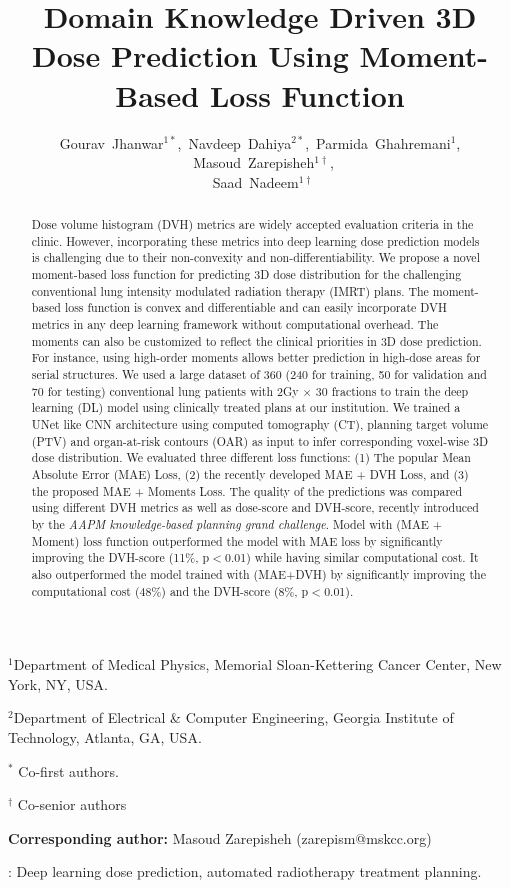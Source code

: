 \documentclass[10pt]{article}
\title{Domain Knowledge Driven 3D Dose Prediction Using Moment-Based Loss Function}
\author{Gourav~Jhanwar$^{1*}$,~Navdeep~Dahiya$^{2*}$,~Parmida~Ghahremani$^{1}$, ~Masoud~Zarepisheh$^{1\dagger}$,\\~Saad~Nadeem$^{1\dagger}$}
\date{}
\begin{document}
\maketitle

{\footnotesize
\noindent
$^1$Department of Medical Physics, Memorial Sloan-Kettering Cancer Center, New York, NY, USA.

\noindent
$^2$Department of Electrical \& Computer Engineering, Georgia Institute of Technology, Atlanta, GA, USA.

\noindent
$^*$ Co-first authors.

\noindent
$^\dagger$ Co-senior authors

\noindent
\textbf{Corresponding author:} Masoud Zarepisheh (zarepism@mskcc.org)
}

\begin{abstract}
\noindent

Dose volume histogram (DVH) metrics are widely accepted evaluation criteria in the clinic. However, incorporating these metrics into deep learning dose prediction models is challenging due to their non-convexity and non-differentiability. We propose a novel moment-based loss function for predicting 3D dose distribution for the challenging conventional lung intensity modulated radiation therapy (IMRT) plans. The moment-based loss function is convex and differentiable and can easily incorporate DVH metrics in any deep learning framework without computational overhead. The moments can also be customized to reflect the clinical priorities in 3D dose prediction. For instance, using high-order moments allows better prediction in high-dose areas for serial structures. We used a large dataset of 360 (240 for training, 50 for validation and 70 for testing)  conventional lung patients with 2Gy $\times$ 30 fractions to train the deep learning (DL) model using clinically treated plans at our institution. We trained a UNet like CNN architecture using computed tomography (CT), planning target volume (PTV) and organ-at-risk contours (OAR) as input to infer corresponding voxel-wise 3D dose distribution. We evaluated three different loss functions: (1) The popular Mean Absolute Error (MAE) Loss, (2) the recently developed MAE + DVH Loss, and (3) the proposed MAE + Moments Loss. The quality of the predictions was compared using different DVH metrics as well as dose-score and DVH-score, recently introduced by the \textit{AAPM knowledge-based planning grand challenge}. Model with (MAE + Moment) loss function outperformed the model with MAE loss by significantly improving the DVH-score (11\%, p$<$0.01) while having similar computational cost. It also outperformed the model trained with (MAE+DVH) by significantly improving the computational cost (48\%) and the DVH-score (8\%, p$<$0.01). 

\end{abstract}
: Deep learning dose prediction, automated radiotherapy treatment planning.
\end{document}
